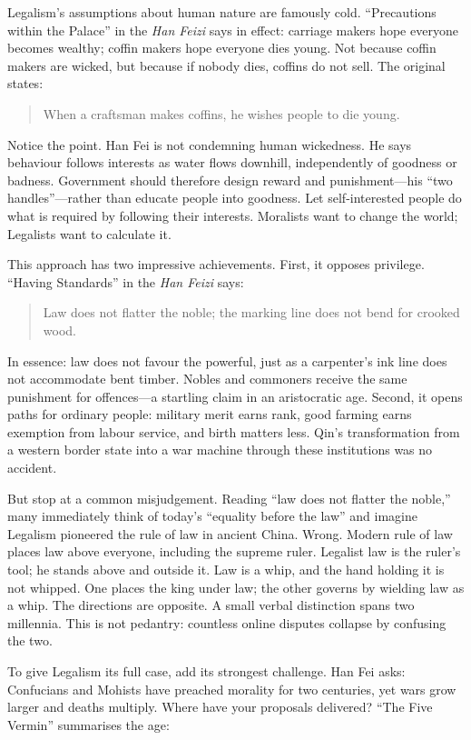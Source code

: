 Legalism's assumptions about human nature are famously cold. ``Precautions within the Palace'' in the \textit{Han Feizi} says in effect: carriage makers hope everyone becomes wealthy; coffin makers hope everyone dies young. Not because coffin makers are wicked, but because if nobody dies, coffins do not sell. The original states:

\begin{quote}
When a craftsman makes coffins, he wishes people to die young.
\end{quote}
Notice the point. Han Fei is not condemning human wickedness. He says behaviour follows interests as water flows downhill, independently of goodness or badness. Government should therefore design reward and punishment---his ``two handles''---rather than educate people into goodness. Let self-interested people do what is required by following their interests. Moralists want to change the world; Legalists want to calculate it.

This approach has two impressive achievements. First, it opposes privilege. ``Having Standards'' in the \textit{Han Feizi} says:

\begin{quote}
Law does not flatter the noble; the marking line does not bend for crooked wood.
\end{quote}
In essence: law does not favour the powerful, just as a carpenter's ink line does not accommodate bent timber. Nobles and commoners receive the same punishment for offences---a startling claim in an aristocratic age. Second, it opens paths for ordinary people: military merit earns rank, good farming earns exemption from labour service, and birth matters less. Qin's transformation from a western border state into a war machine through these institutions was no accident.

But stop at a common misjudgement. Reading ``law does not flatter the noble,'' many immediately think of today's ``equality before the law'' and imagine Legalism pioneered the rule of law in ancient China. Wrong. Modern rule of law places law above everyone, including the supreme ruler. Legalist law is the ruler's tool; he stands above and outside it. Law is a whip, and the hand holding it is not whipped. One places the king under law; the other governs by wielding law as a whip. The directions are opposite. A small verbal distinction spans two millennia. This is not pedantry: countless online disputes collapse by confusing the two.

To give Legalism its full case, add its strongest challenge. Han Fei asks: Confucians and Mohists have preached morality for two centuries, yet wars grow larger and deaths multiply. Where have your proposals delivered? ``The Five Vermin'' summarises the age:

